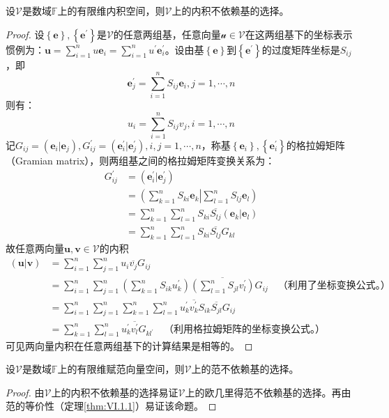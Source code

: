 \documentclass[main.tex]{subfiles}
\begin{document}
\begin{theorem}\label{thm:II.4.15}
设$\mathcal{V}$是数域$\mathbb{F}$上的有限维内积空间，则$\mathcal{V}$上的内积不依赖基的选择。
\end{theorem}
\begin{proof}
设$\left\{\mathbf{e}\right\},\left\{\mathbf{e}^\prime\right\}$是$\mathcal{V}$的任意两组基，任意向量$\mathcal{u}\in\mathcal{V}$在这两组基下的坐标表示惯例为：$\mathbf{u}=\sum_{i=1}^nu\mathbf{e}_i=\sum_{i=1}^nu^\prime\mathbf{e}^\prime_i$。设由基$\left\{\mathbf{e}\right\}$到$\left\{\mathbf{e}^\prime\right\}$的过度矩阵坐标是$S_{ij}$，即
\[
\mathbf{e}_j^\prime=\sum_{i=1}^nS_{ij}\mathbf{e}_i,j=1,\cdots,n\]
则有：
\[u_i=\sum_{i=1}^nS_{ij}v_j,i=1,\cdots,n\]
记$G_{ij}=\left(\mathbf{e}_i|\mathbf{e}_j\right),G_{ij}^\prime=\left(\mathbf{e}^\prime_i|\mathbf{e}^\prime_j\right),i,j=1,\cdots,n$，称基$\left\{\mathbf{e}_i\right\},\left\{\mathbf{e}^\prime_i\right\}$的格拉姆矩阵（Gramian matrix），则两组基之间的格拉姆矩阵变换关系为：
\begin{align*}
    G^\prime_{ij}&=\left(\mathbf{e}^\prime_i|\mathbf{e}^\prime_j\right)\\
    &=\left(\sum_{k=1}^n S_{ki}\mathbf{e}_k\right|\left.\sum_{l=1}^n S_{lj}\mathbf{e}_l\right)\\
    &=\sum_{k=1}^n\sum_{l=1}^nS_{ki}\overline{S_{lj}}\left(\mathbf{e}_k|\mathbf{e}_l\right)\\
    &=\sum_{k=1}^n\sum_{l=1}^nS_{ki}\overline{S_{lj}}G_{kl}
\end{align*}
故任意两向量$\mathbf{u},\mathbf{v}\in\mathcal{V}$的内积
\begin{align*}
    \left(\mathbf{u}|\mathbf{v}\right)&=\sum_{i=1}^n\sum_{j=1}^nu_i\overline{v_j}G_{ij}\\
    &=\sum_{i=1}^n\sum_{j=1}^n\left(\sum_{k=1}^nS_{ik}u_k^\prime\right)\overline{\left(\sum_{l=1}^nS_{jl}v_l^\prime\right)}G_{ij}\quad\text{（利用了坐标变换公式。）}\\
    &=\sum_{i=1}^n\sum_{j=1}^n\sum_{k=1}^n\sum_{l=1}^nu_k^\prime\overline{v_k^\prime}S_{ik}\overline{S_{jl}}G_{ij}\\
    &=\sum_{k=1}^n\sum_{l=1}^nu_k^\prime\overline{v_l^\prime}G_{kl^\prime}\quad\text{（利用格拉姆矩阵的坐标变换公式。）}
\end{align*}
可见两向量内积在任意两组基下的计算结果是相等的。
\end{proof}
\begin{corollary}
设$\mathcal{V}$是数域$\mathbb{F}$上的有限维赋范向量空间，则$\mathcal{V}$上的范不依赖基的选择。
\end{corollary}
\begin{proof}
由$\mathcal{V}$上的内积不依赖基的选择易证$\mathcal{V}$上的欧几里得范不依赖基的选择。再由范的等价性（定理\ref{thm:VI.1.1}）易证该命题。
\end{proof}
\end{document}
